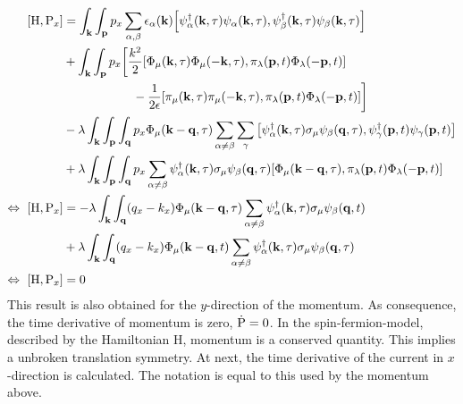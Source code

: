 \begin{align}
	\comm{\mt{H}}{\mt{P}_{x}} &= 
		\int_{\vb{k}} \int_{\vb{p}}
		p_{x}
		\sum\limits_{\alpha,\beta} 
		\epsilon_{\alpha}(\vb{k})
		\comm{\psi_{\alpha}^{\dag}(\vb{k},\tau) \psi_{\alpha}(\vb{k},\tau)}{\psi_{\beta}^{\dag}(\vb{k},\tau) \psi_{\beta}(\vb{k},\tau)}
		\notag \\&
		+
		\int_{\vb{k}} \int_{\vb{p}}
		p_{x}
		\bigg[
			\frac{k^{2}}{2}
			\comm{\Phi_{\mu}(\vb{k},\tau) \Phi_{\mu}(-\vb{k},\tau)}{\pi_{\lambda}(\vb{p},t) \Phi_{\lambda}(-\vb{p},t)}
			\notag \\& \hspace{2cm}
			-
			\frac{1}{2\epsilon}
			\comm{\pi_{\mu}(\vb{k},\tau) \pi_{\mu}(-\vb{k},\tau)}{\pi_{\lambda}(\vb{p},t) \Phi_{\lambda}(-\vb{p},t)}
		\bigg]
		\notag \\&
		-
		\lambda
		\int_{\vb{k}} \int_{\vb{p}} \int_{\vb{q}}
		p_{x}
		\Phi_{\mu}(\vb{k}-\vb{q},\tau)
		\sum\limits_{\alpha\neq\beta}
		\sum\limits_{\gamma}
		\comm{\psi_{\alpha}^{\dag}(\vb{k},\tau) \sigma_{\mu} \psi_{\beta}(\vb{q},\tau)}{\psi_{\gamma}^{\dag}(\vb{p},t) \psi_{\gamma}(\vb{p},t)}
		\notag \\&
		+
		\lambda
		\int_{\vb{k}} \int_{\vb{p}} \int_{\vb{q}}
		p_{x}
		\sum\limits_{\alpha\neq\beta}
		\psi_{\alpha}^{\dag}(\vb{k},\tau) \sigma_{\mu} \psi_{\beta}(\vb{q},\tau)
		\comm{\Phi_{\mu}(\vb{k}-\vb{q},\tau)}{\pi_{\lambda}(\vb{p},t) \Phi_{\lambda}(-\vb{p},t)}
	\notag \\
	\Leftrightarrow\ \comm{\mt{H}}{\mt{P}_{x}} &=	
		-
		\lambda
		\int_{\vb{k}} \int_{\vb{q}}
		(q_{x}-k_{x})
		\Phi_{\mu}(\vb{k}-\vb{q},\tau)
		\sum\limits_{\alpha\neq\beta}
		\psi_{\alpha}^{\dag}(\vb{k},\tau) \sigma_{\mu} \psi_{\beta}(\vb{q},t)
		\notag \\&
		+
		\lambda
		\int_{\vb{k}} \int_{\vb{q}}
		(q_{x}-k_{x})
		\Phi_{\mu}(\vb{k}-\vb{q},t)
		\sum\limits_{\alpha\neq\beta}
		\psi_{\alpha}^{\dag}(\vb{k},\tau) \sigma_{\mu} \psi_{\beta}(\vb{q},\tau)
	\notag \\
	\Leftrightarrow\ \comm{\mt{H}}{\mt{P}_{x}} &= 0
\end{align}
%
This result is also obtained for the $y$-direction of the momentum.
As consequence, the time derivative of momentum is zero, $\dot{\mathrm{P}} = 0$.
In the spin-fermion-model, described by the Hamiltonian H, momentum is a conserved quantity.
This implies a unbroken translation symmetry.
At next, the time derivative of the current in $x$-direction is calculated.
The notation is equal to this used by the momentum above.
%
